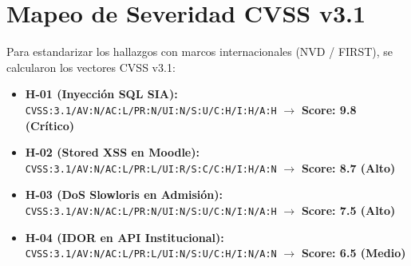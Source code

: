 \section{Mapeo de Severidad CVSS v3.1}
Para estandarizar los hallazgos con marcos internacionales (NVD / FIRST), se calcularon los vectores CVSS v3.1:

\begin{itemize}
    \item \textbf{H-01 (Inyección SQL SIA):} \texttt{CVSS:3.1/AV:N/AC:L/PR:N/UI:N/S:U/C:H/I:H/A:H} $\rightarrow$ \textbf{Score: 9.8 (Crítico)}
    \item \textbf{H-02 (Stored XSS en Moodle):} \texttt{CVSS:3.1/AV:N/AC:L/PR:L/UI:R/S:C/C:H/I:H/A:N} $\rightarrow$ \textbf{Score: 8.7 (Alto)}
    \item \textbf{H-03 (DoS Slowloris en Admisión):} \texttt{CVSS:3.1/AV:N/AC:L/PR:N/UI:N/S:U/C:N/I:N/A:H} $\rightarrow$ \textbf{Score: 7.5 (Alto)}
    \item \textbf{H-04 (IDOR en API Institucional):} \texttt{CVSS:3.1/AV:N/AC:L/PR:L/UI:N/S:U/C:H/I:N/A:N} $\rightarrow$ \textbf{Score: 6.5 (Medio)}
\end{itemize}
